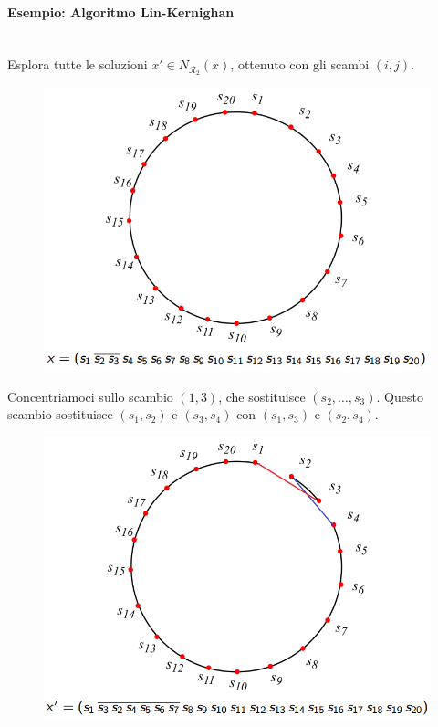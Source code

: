 \documentclass{article}
\begin{document}
\paragraph{Esempio: Algoritmo Lin-Kernighan}\mbox{}\\
Esplora tutte le soluzioni $x'\in N_{\mathcal{R}_2}(x)$, ottenuto con gli scambi
$(i,j)$.
\begin{figure}[H]
    \centering
    \includegraphics[scale=0.5]{images/exampl_kernig1.png}
\end{figure}
Concentriamoci sullo scambio $(1,3)$, che sostituisce $(s_2,\dots,s_3)$.
Questo scambio sostituisce $(s_1,s_2)$ e $(s_3,s_4)$ con $(s_1,s_3)$ e $(s_2,s_4)$.
\begin{figure}[H]
    \centering
    \includegraphics[scale=0.5]{images/exampl_kernig2.png}
\end{figure}
\end{document}
